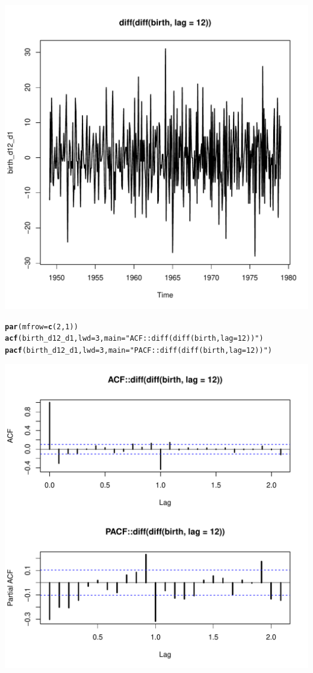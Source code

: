\documentclass[10pt]{article}\usepackage[]{graphicx}\usepackage[]{color}
\makeatletter
\def\maxwidth{ %
  \ifdim\Gin@nat@width>\linewidth
    \linewidth
  \else
    \Gin@nat@width
  \fi
}
\newcommand{\hlnum}[1]{\textcolor[rgb]{0.686,0.059,0.569}{#1}}%
\newcommand{\hlstr}[1]{\textcolor[rgb]{0.192,0.494,0.8}{#1}}%
\newcommand{\hlstd}[1]{\textcolor[rgb]{0.345,0.345,0.345}{#1}}%
\newcommand{\hlkwc}[1]{\textcolor[rgb]{0.333,0.667,0.333}{#1}}%
\newcommand{\hlkwd}[1]{\textcolor[rgb]{0.737,0.353,0.396}{\textbf{#1}}}%
\newenvironment{kframe}{%
 \def\at@end@of@kframe{}%
 \ifinner\ifhmode%
  \def\at@end@of@kframe{\end{minipage}}%
  \begin{minipage}{\columnwidth}%
 \fi\fi%
 \def\FrameCommand##1{\hskip\@totalleftmargin \hskip-\fboxsep
 \colorbox{shadecolor}{##1}\hskip-\fboxsep
     \hskip-\linewidth \hskip-\@totalleftmargin \hskip\columnwidth}%
 \MakeFramed {\advance\hsize-\width
   \@totalleftmargin\z@ \linewidth\hsize
   \@setminipage}}%
 {\par\unskip\endMakeFramed%
 \at@end@of@kframe}
\newenvironment{knitrout}{}{} %
\makeatother
\begin{document}
\begin{knitrout}
\includegraphics[width=\maxwidth]{figure/unnamed-chunk-3-2} 
\begin{kframe}\begin{alltt}
\hlkwd{par}\hlstd{(}\hlkwc{mfrow}\hlstd{=}\hlkwd{c}\hlstd{(}\hlnum{2}\hlstd{,}\hlnum{1}\hlstd{))}
\hlkwd{acf}\hlstd{(birth_d12_d1,}\hlkwc{lwd} \hlstd{=} \hlnum{3}\hlstd{,} \hlkwc{main} \hlstd{=} \hlstr{"ACF::diff(diff(birth, lag = 12))"}\hlstd{)}
\hlkwd{pacf}\hlstd{(birth_d12_d1,}\hlkwc{lwd} \hlstd{=} \hlnum{3}\hlstd{,} \hlkwc{main} \hlstd{=} \hlstr{"PACF::diff(diff(birth, lag = 12))"}\hlstd{)}
\end{alltt}
\end{kframe}
\includegraphics[width=\maxwidth]{figure/unnamed-chunk-3-3} 

\end{knitrout}
\end{document}
